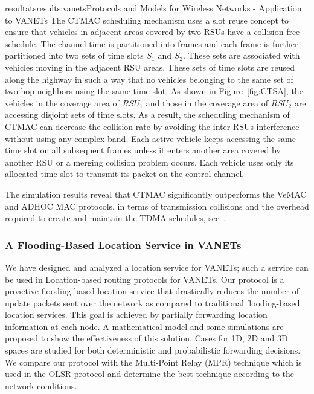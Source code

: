 \documentclass{ra2016}
\begin{document}
\begin{module}{resultats}{results:vanets}{Protocols and Models for Wireless Networks - Application to VANETs}
The CTMAC scheduling mechanism uses a slot reuse concept 
to ensure that vehicles in adjacent areas covered by two RSUs have 
a collision-free schedule. The channel time is partitioned into frames and
each frame is further partitioned into two sets of time slots $S_1$ and $S_2$. 
These sets are associated with vehicles moving in the adjacent RSU areas. 
These sets of time slots are reused along the highway in such a way that no vehicles belonging to 
the same set of two-hop 
neighbors using the same time slot. As shown in Figure~\ref{fig:CTSA}, the vehicles in 
the coverage area of $RSU_1$ and those in the coverage area of $RSU_2$ are
accessing disjoint sets of time slots. As a result, the scheduling mechanism of 
CTMAC can decrease the collision rate by avoiding the inter-RSUs interference 
without using any complex band.  Each active vehicle keeps accessing the same 
time slot on all subsequent frames unless it enters another area covered by another 
RSU or a merging collision problem occurs. Each vehicle uses only its allocated 
time slot to transmit its packet on the control channel.

The simulation results
reveal that CTMAC significantly outperforms the VeMAC and
ADHOC MAC protocols. in terms of transmission collisions
and the overhead required to create and maintain the TDMA
schedules, see~\cite{hadded:hal-01379219}. 

\subsubsection{A Flooding-Based Location Service in VANETs}

\begin{participants}
\end{participants}

We have designed and analyzed a location service for VANETs; 
such a service can be used in Location-based routing protocols for 
VANETs. Our protocol is  a proactive
flooding-based location service that drastically reduces the
number of update packets sent over the network as compared to
traditional flooding-based location services. This goal is achieved
by partially forwarding location information at each node. A
mathematical model and some simulations are proposed to show
the effectiveness of this solution. Cases for 1D, 2D and 3D spaces
are studied for both deterministic and probabilistic forwarding
decisions. We compare our protocol with the Multi-Point Relay (MPR) 
technique which is used in the OLSR protocol and determine the best  technique 
according to the network conditions.  


\end{module}
\end{document}
